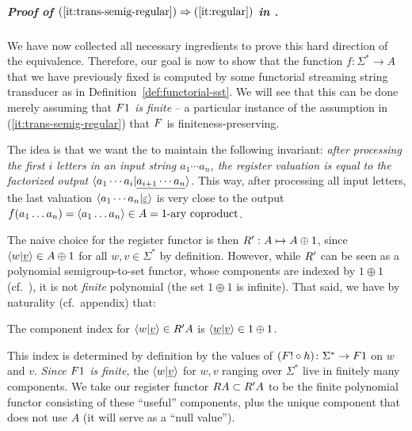 \subparagraph*{Proof of $(\ref{it:trans-semig-regular}) \Rightarrow (\ref{it:regular})$ in .}
We have now collected all necessary ingredients to prove this hard direction of
the equivalence. Therefore, our goal is now to show that the function $f\colon
\Sigma^* \to A$ that we have previously fixed is computed by some functorial
streaming string transducer as in Definition~\ref{def:functorial-sst}.
We will see that this can be done merely assuming that \emph{$\functor 1$ is finite} -- a particular instance of the assumption in (\ref{it:trans-semig-regular}) that $\functor$ is finiteness-preserving.

The idea is that we want the \sst to maintain the following invariant: \emph{after processing the first $i$ letters in an input string $a_1 \cdots a_n$, the register valuation is equal to the factorized output $\langle a_1 \cdots a_i | \underline{a_{i+1} \cdots a_n} \rangle$}. This way, after processing all input letters, the last valuation $\langle a_1 \cdots a_n | \underline{\varepsilon} \rangle$ is very close to the output $f(a_1\dots a_n) = \langle a_1 \dots a_n \rangle \in A = \text{1-ary coproduct}$.

The naive choice for the register functor is then $\functorr' : A \mapsto A \oplus 1$, since $\langle w|\underline{v} \rangle \in A\oplus1$ for all $w,v\in\Sigma^*$ by definition. However, while $\functorr'$ can be seen as a polynomial semigroup-to-set functor, whose components are indexed by $1 \oplus 1$ (cf.~), it is not \emph{finite} polynomial (the set $1\oplus1$ is infinite). That said, we have by naturality (cf.~appendix) that:
\begin{claim}
  The component index for $\tuple{w|\underline{v}} \in \functorr'A$ is $\langle \underline{w}|\underline{v} \rangle \in 1 \oplus 1$.
\end{claim}
This index is determined by definition by the values of $(\functor! \circ h) \colon \Sigma^* \to \functor1$ on $w$ and $v$. \emph{Since $\functor1$ is finite,} the $\langle w|\underline{v} \rangle$ for $w,v$ ranging over $\Sigma^*$ live in finitely many components. We take our register functor  $\functorr A \subset \functorr' A$ to be the finite polynomial functor consisting of these \enquote{useful} components, plus the unique component that does not use $A$ (it will serve as a \enquote{null value}).


